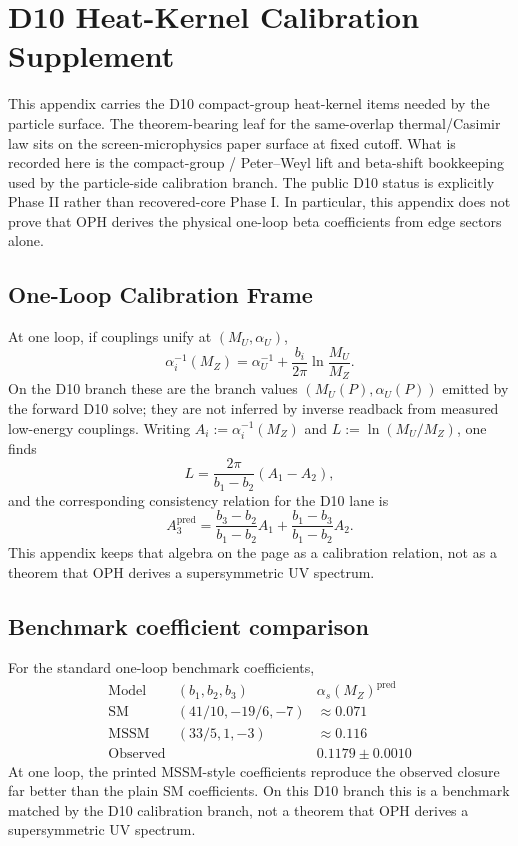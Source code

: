 \section{D10 Heat-Kernel Calibration Supplement}
\label{app:particle-d10-heat-kernel}

This appendix carries the D10 compact-group heat-kernel items needed by the particle surface.
The theorem-bearing leaf for the same-overlap thermal/Casimir law sits on the
screen-microphysics paper surface at fixed cutoff. What is recorded here is the
compact-group / Peter--Weyl lift and beta-shift bookkeeping used by the particle-side
calibration branch. The public D10 status is explicitly Phase II rather than recovered-core
Phase I. In particular, this appendix does not prove that OPH derives the physical
one-loop beta coefficients from edge sectors alone.

\subsection{One-Loop Calibration Frame}

At one loop, if couplings unify at \((M_U,\alpha_U)\),
\[
\alpha_i^{-1}(M_Z)=\alpha_U^{-1}+\frac{b_i}{2\pi}\ln\frac{M_U}{M_Z}.
\]
On the D10 branch these are the branch values \((M_U(P),\alpha_U(P))\) emitted by the forward
D10 solve; they are not inferred by inverse readback from measured low-energy couplings.
Writing \(A_i:=\alpha_i^{-1}(M_Z)\) and \(L:=\ln(M_U/M_Z)\), one finds
\[
L=\frac{2\pi}{b_1-b_2}(A_1-A_2),
\]
and the corresponding consistency relation for the D10 lane is
\[
A_3^{\mathrm{pred}}
=
\frac{b_3-b_2}{b_1-b_2}A_1
+
\frac{b_1-b_3}{b_1-b_2}A_2.
\]
This appendix keeps that algebra on the page as a calibration relation, not as a theorem that OPH
derives a supersymmetric UV spectrum.

\subsection{Benchmark coefficient comparison}

For the standard one-loop benchmark coefficients,
\[
\begin{array}{c|c|c}
\text{Model} & (b_1,b_2,b_3) & \alpha_s(M_Z)^{\mathrm{pred}} \\
\hline
\text{SM} & (41/10,-19/6,-7) & \approx 0.071 \\
\text{MSSM} & (33/5,1,-3) & \approx 0.116 \\
\text{Observed} & & 0.1179\pm 0.0010
\end{array}
\]
At one loop, the printed MSSM-style coefficients reproduce the observed closure far better than
the plain SM coefficients. On this D10 branch this is a benchmark matched by the D10
calibration branch, not a theorem that OPH derives a supersymmetric UV spectrum.

